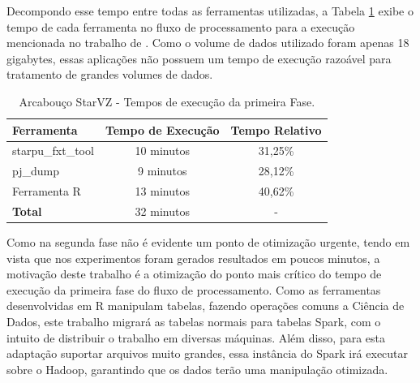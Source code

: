 Decompondo esse tempo entre todas as ferramentas utilizadas, a Tabela 
\ref{tab:exectimes} exibe o tempo de cada ferramenta no fluxo de processamento 
para a execução mencionada no trabalho de \citet{ref:starvz}. Como o volume de 
dados utilizado foram apenas 18 gigabytes, essas aplicações não possuem um tempo 
de execução razoável para tratamento de grandes volumes de dados.

\begin{table}[H]
\centering
\begin{tabular}{l c c} \toprule
\textbf{Ferramenta}  &  \textbf{Tempo de Execução}  & \textbf{Tempo Relativo}\\ \midrule
starpu\_fxt\_tool     & 10 minutos   & 31,25\%  \\
pj\_dump            & 9 minutos    & 28,12\%     \\
Ferramenta R        & 13 minutos   & 40,62\%      \\
\textbf{Total}     & 32 minutos & -
\end{tabular}
\caption{Arcabouço StarVZ - Tempos de execução da primeira Fase.}
\label{tab:exectimes}
\end{table}

Como na segunda fase não é evidente um ponto de otimização urgente, tendo em 
vista que nos experimentos foram gerados resultados em poucos minutos, a 
motivação deste trabalho é a otimização do ponto mais crítico do tempo de 
execução da primeira fase do fluxo de processamento. Como as ferramentas 
desenvolvidas em R manipulam tabelas, fazendo operações comuns a Ciência de 
Dados, este trabalho migrará as tabelas normais para tabelas Spark, com o 
intuito de distribuir o trabalho em diversas máquinas. Além disso, para esta 
adaptação suportar arquivos muito grandes, essa instância do Spark irá
executar sobre o Hadoop, garantindo que os dados terão uma manipulação 
otimizada.